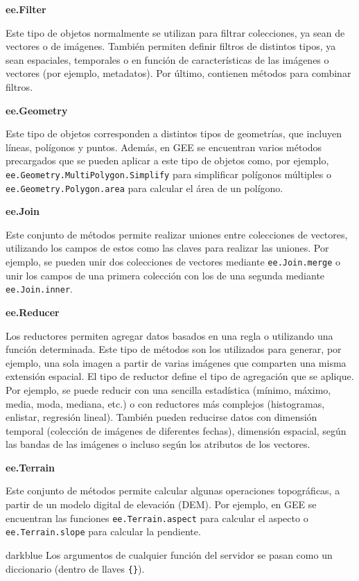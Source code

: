 \documentclass[
  12pt,
  letterpaper,
  twoside]{book}
\begin{document}
\textbf{ee.Filter}

Este tipo de objetos normalmente se utilizan para filtrar colecciones, ya sean de vectores o de imágenes. También permiten definir filtros de distintos tipos, ya sean espaciales, temporales o en función de características de las imágenes o vectores (por ejemplo, metadatos). Por último, contienen métodos para combinar filtros.

\textbf{ee.Geometry}

Este tipo de objetos corresponden a distintos tipos de geometrías, que incluyen líneas, polígonos y puntos. Además, en GEE se encuentran varios métodos precargados que se pueden aplicar a este tipo de objetos como, por ejemplo, \texttt{ee.Geometry.MultiPolygon.Simplify} para simplificar polígonos múltiples o \texttt{ee.Geometry.Polygon.area} para calcular el área de un polígono.

\textbf{ee.Join}

Este conjunto de métodos permite realizar uniones entre colecciones de vectores, utilizando los campos de estos como las claves para realizar las uniones. Por ejemplo, se pueden unir dos colecciones de vectores mediante \texttt{ee.Join.merge} o unir los campos de una primera colección con los de una segunda mediante \texttt{ee.Join.inner}.

\textbf{ee.Reducer}

Los reductores permiten agregar datos basados en una regla o utilizando una función determinada. Este tipo de métodos son los utilizados para generar, por ejemplo, una sola imagen a partir de varias imágenes que comparten una misma extensión espacial. El tipo de reductor define el tipo de agregación que se aplique. Por ejemplo, se puede reducir con una sencilla estadística (mínimo, máximo, media, moda, mediana, etc.) o con reductores más complejos (histogramas, enlistar, regresión lineal). También pueden reducirse datos con dimensión temporal (colección de imágenes de diferentes fechas), dimensión espacial, según las bandas de las imágenes o incluso según los atributos de los vectores.

\textbf{ee.Terrain}

Este conjunto de métodos permite calcular algunas operaciones topográficas, a partir de un modelo digital de elevación (DEM). Por ejemplo, en GEE se encuentran las funciones \texttt{ee.Terrain.aspect} para calcular el aspecto o \texttt{ee.Terrain.slope} para calcular la pendiente.

\begin{bluebox2}

\begin{awesomeblock}{5pt}{\faLightbulb}{darkblue}
Los argumentos de cualquier función del servidor se pasan como un diccionario (dentro de llaves \texttt{\{\}}).

\end{awesomeblock}

\end{bluebox2}
\end{document}
